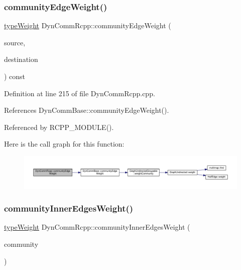 \subsubsection{\texorpdfstring{community\+Edge\+Weight()}{communityEdgeWeight()}}
{\footnotesize\ttfamily \hyperlink{edge_8h_a2e7ea3be891ac8b52f749ec73fee6dd2}{type\+Weight} Dyn\+Comm\+Rcpp\+::community\+Edge\+Weight (\begin{DoxyParamCaption}\item[{\hyperlink{graphUndirectedGroupable_8h_a914da95c9ea7f14f4b7f875c36818556}{type\+Community}}]{source,  }\item[{\hyperlink{graphUndirectedGroupable_8h_a914da95c9ea7f14f4b7f875c36818556}{type\+Community}}]{destination }\end{DoxyParamCaption}) const\hspace{0.3cm}{\ttfamily [inline]}}



Definition at line 215 of file Dyn\+Comm\+Rcpp.\+cpp.



References Dyn\+Comm\+Base\+::community\+Edge\+Weight().



Referenced by R\+C\+P\+P\+\_\+\+M\+O\+D\+U\+L\+E().

Here is the call graph for this function\+:\nopagebreak
\begin{figure}[H]
\begin{center}
\leavevmode
\includegraphics[width=350pt]{classDynCommRcpp_ad74a2abe244e62d9df2b98aeea0d3155_cgraph}
\end{center}
\end{figure}
\mbox{\label{classDynCommRcpp_aed6b4f1e844956429eb9a15d8d6df7b6}} 
\subsubsection{\texorpdfstring{community\+Inner\+Edges\+Weight()}{communityInnerEdgesWeight()}}
{\footnotesize\ttfamily \hyperlink{edge_8h_a2e7ea3be891ac8b52f749ec73fee6dd2}{type\+Weight} Dyn\+Comm\+Rcpp\+::community\+Inner\+Edges\+Weight (\begin{DoxyParamCaption}\item[{int}]{community }\end{DoxyParamCaption})\hspace{0.3cm}{\ttfamily [inline]}}




